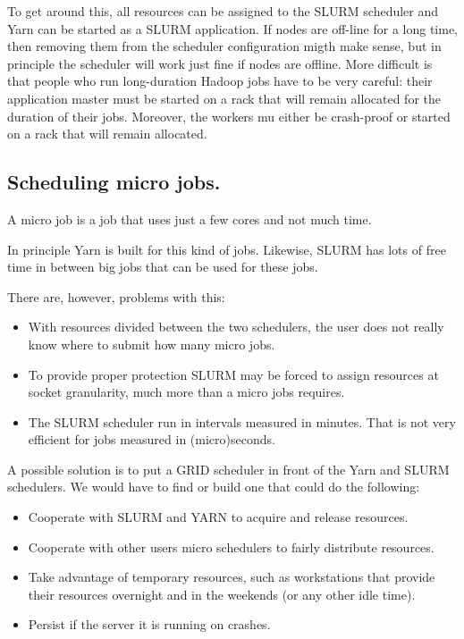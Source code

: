 \documentclass{article}
\begin{document}
To get around this, all resources can be assigned to the SLURM scheduler and
Yarn can be started as a SLURM application. If nodes are off-line for a long time,
then removing them from the scheduler configuration migth make sense, but in principle
the scheduler will work just fine if nodes are offline. More difficult is that
people who run long-duration Hadoop jobs have to be very careful: their application master
must be started on a rack that will remain allocated for the duration
of their jobs. Moreover, the workers mu either be crash-proof or started on a rack that
will remain allocated.


\subsection{Scheduling micro jobs.}

A micro job is a job that uses just a few cores and not much time.

In principle Yarn is built for this kind of jobs.
Likewise, SLURM has lots of free time in between big jobs that
can be used for these jobs.

There are, however, problems with this:
\begin{itemize}
\item With resources divided between the two schedulers, the user
does not really know where to submit how many micro jobs.
\item To provide proper protection SLURM may be forced to assign
resources at socket granularity, much more than a micro jobs requires.
\item The SLURM scheduler run in intervals measured in minutes.
That is not very efficient for jobs measured in (micro)seconds.
\end{itemize}

A possible solution is to put a GRID scheduler in front of
the Yarn and SLURM schedulers. We would have to find or build
one that could do the following:
\begin{itemize}
\item Cooperate with SLURM and YARN to acquire and release resources.
\item Cooperate with other users micro schedulers to fairly distribute
resources.
\item Take advantage of temporary resources, such as workstations that 
provide their resources overnight and in the weekends (or any other idle time).
\item Persist if the server it is running on crashes.
\end{itemize}
\end{document}
